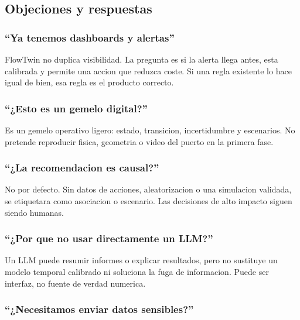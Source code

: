 \documentclass[
  spanish,
  10pt,
  a4paper,
]{article}
\begin{document}
\subsection{Objeciones y respuestas}\label{objeciones-y-respuestas}

\subsubsection{``Ya tenemos dashboards y
alertas''}\label{ya-tenemos-dashboards-y-alertas}

FlowTwin no duplica visibilidad. La pregunta es si la alerta llega
antes, esta calibrada y permite una accion que reduzca coste. Si una
regla existente lo hace igual de bien, esa regla es el producto
correcto.

\subsubsection{``¿Esto es un gemelo
digital?''}\label{esto-es-un-gemelo-digital}

Es un gemelo operativo ligero: estado, transicion, incertidumbre y
escenarios. No pretende reproducir fisica, geometria o video del puerto
en la primera fase.

\subsubsection{``¿La recomendacion es
causal?''}\label{la-recomendacion-es-causal}

No por defecto. Sin datos de acciones, aleatorizacion o una simulacion
validada, se etiquetara como asociacion o escenario. Las decisiones de
alto impacto siguen siendo humanas.

\subsubsection{``¿Por que no usar directamente un
LLM?''}\label{por-que-no-usar-directamente-un-llm}

Un LLM puede resumir informes o explicar resultados, pero no sustituye
un modelo temporal calibrado ni soluciona la fuga de informacion. Puede
ser interfaz, no fuente de verdad numerica.

\subsubsection{``¿Necesitamos enviar datos
sensibles?''}\label{necesitamos-enviar-datos-sensibles}
\end{document}
